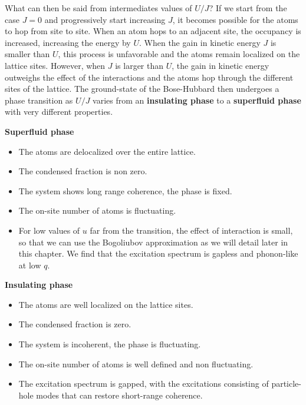 What can then be said from intermediates values of $U/J$? If we start from the case $J=0$ and progressively start increasing $J$, it becomes possible for the atoms to hop from site to site. When an atom hops to an adjacent site, the occupancy is increased, increasing the energy by $U$. When the gain in kinetic energy $J$ is smaller than $U$, this process is unfavorable and the atoms remain localized on the lattice sites. However, when $J$ is larger than $U$, the gain in kinetic energy outweighs the effect of the interactions and the atoms hop through the different sites of the lattice. The ground-state of the Bose-Hubbard then undergoes a phase transition as $U/J$ varies from an \textbf{insulating phase} to a \textbf{superfluid phase} with very different properties.

\begin{minipage}[t]{0.45\textwidth}
    \noindent \textbf{Superfluid phase}
    \begin{itemize}
        \item The atoms are delocalized over the entire lattice.
        \item The condensed fraction is non zero.
        \item The system shows long range coherence, \ie the phase is fixed.
        \item The on-site number of atoms is fluctuating.
        \item For low values of $u$ far from the transition, the effect of interaction is small, so that we can use the Bogoliubov approximation as we will detail later in this chapter. We find that the excitation spectrum is gapless and phonon-like at low $q$.
    \end{itemize}
\end{minipage}
\begin{minipage}[t]{0.48\textwidth}
    \noindent \textbf{Insulating phase}
    \begin{itemize}
        \item The atoms are well localized on the lattice sites.
        \item The condensed fraction is zero.
        \item The system is incoherent, the phase is fluctuating.
        \item The on-site number of atoms is well defined and non fluctuating.
        \item The excitation spectrum is gapped, with the excitations consisting of particle-hole modes that can restore short-range coherence. 
    \end{itemize}
\end{minipage}

